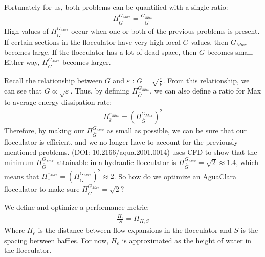 \documentclass[letterpaper,10pt,english]{sphinxmanual}
\begin{document}
Fortunately for us, both problems can be quantified with a single ratio:
\begin{equation}\label{equation:Flocculation/Floc_Design:Flocculation/Floc_Design:8}
\begin{split}\Pi_{\bar G}^{G_{Max}} = \frac{G_{Max}}{\bar G}\end{split}
\end{equation}
High values of \(\Pi_{\bar G}^{G_{Max}}\) occur when one or both of the previous problems is present. If certain sections in the flocculator have very high local \(G\) values, then \(G_{Max}\) becomes large. If the flocculator has a lot of dead space, then \(\bar G\) becomes small. Either way, \(\Pi_{\bar G}^{G_{Max}}\) becomes larger.

 Recall the relationship between \(G\) and \(\varepsilon\) : \(G = \sqrt{ \frac{\varepsilon}{\nu} }\). From this relationship, we can see that \(G \propto \sqrt{\varepsilon}\). Thus, by defining  \(\Pi_{\bar G}^{G_{Max}}\), we can also define a ratio for Max to average energy dissipation rate:
\begin{equation}\label{equation:Flocculation/Floc_Design:Flocculation/Floc_Design:9}
\begin{split}\Pi_{\bar \varepsilon}^{\varepsilon_{Max}} = \left( \Pi_{\bar G}^{G_{Max}} \right)^2\end{split}
\end{equation}
Therefore, by making our \(\Pi_{\bar G}^{G_{Max}}\) as small as possible, we can be sure that our flocculator is efficient, and we no longer have to account for the previously mentioned problems.  (DOI: 10.2166/aqua.2001.0014) uses CFD to show that the minimum \(\Pi_{\bar G}^{G_{Max}}\) attainable in a hydraulic flocculator is \(\Pi_{\bar G}^{G_{Max}} = \sqrt{2} \approx 1.4\), which means that \(\Pi_{\bar \varepsilon}^{\varepsilon_{Max}} = \left( \Pi_{\bar G}^{G_{Max}} \right)^2 \approx 2\). So how do we optimize an AguaClara flocculator to make sure \(\Pi_{\bar G}^{G_{Max}} = \sqrt{2}\)?

We define and optimize a performance metric:
\begin{equation}\label{equation:Flocculation/Floc_Design:Flocculation/Floc_Design:10}
\begin{split}\frac{H_e}{S} = \Pi_{H_eS}\end{split}
\end{equation}
Where \(H_e\) is the distance between flow expansions in the flocculator and \(S\) is the spacing between baffles. For now, \(H_e\) is approximated as the height of water in the flocculator.
\end{document}
